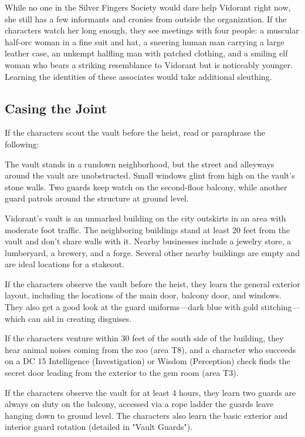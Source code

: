 \documentclass[10pt,a4paper,twoside,bg=print,twocolumn,openany,nodeprecatedcode]{dndbook}
\begin{document}
While no one in the Silver Fingers Society would dare help Vidorant right now, she still has a few informants and cronies from outside the organization. If the characters watch her long enough, they see meetings with four people: a muscular half-orc woman in a fine suit and hat, a sneering human man carrying a large leather case, an unkempt halfling man with patched clothing, and a smiling elf woman who bears a striking resemblance to Vidorant but is noticeably younger. Learning the identities of these associates would take additional sleuthing.

\subsection{Casing the Joint}
If the characters scout the vault before the heist, read or paraphrase the following:

\begin{DndReadAloud}{}
The vault stands in a rundown neighborhood, but the street and alleyways around the vault are unobstructed. Small windows glint from high on the vault's stone walls. Two guards keep watch on the second-floor balcony, while another guard patrols around the structure at ground level.

\end{DndReadAloud}

Vidorant's vault is an unmarked building on the city outskirts in an area with moderate foot traffic. The neighboring buildings stand at least 20 feet from the vault and don't share walls with it. Nearby businesses include a jewelry store, a lumberyard, a brewery, and a forge. Several other nearby buildings are empty and are ideal locations for a stakeout.

If the characters observe the vault before the heist, they learn the general exterior layout, including the locations of the main door, balcony door, and windows. They also get a good look at the guard uniforms—dark blue with gold stitching—which can aid in creating disguises.

If the characters venture within 30 feet of the south side of the building, they hear animal noises coming from the zoo (area T8), and a character who succeeds on a DC 15 Intelligence (Investigation) or Wisdom (Perception) check finds the secret door leading from the exterior to the gem room (area T3).

If the characters observe the vault for at least 4 hours, they learn two guards are always on duty on the balcony, accessed via a rope ladder the guards leave hanging down to ground level. The characters also learn the basic exterior and interior guard rotation (detailed in "Vault Guards").
\end{document}
